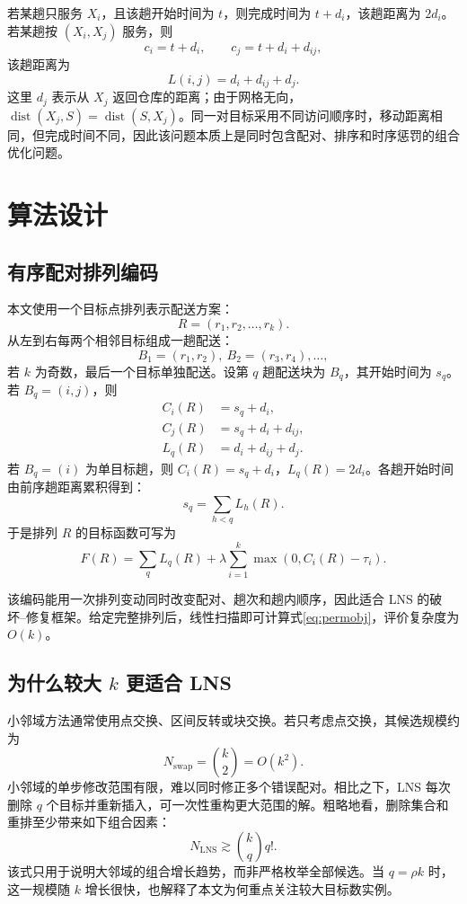 \documentclass[11pt,a4paper]{ctexart}
\begin{document}
\indent 若某趟只服务 $X_i$，且该趟开始时间为 $t$，则完成时间为 $t+d_i$，该趟距离为 $2d_i$。若某趟按 $(X_i,X_j)$ 服务，则
\[
c_i=t+d_i,\qquad c_j=t+d_i+d_{ij},
\]
\indent 该趟距离为
\[
L(i,j)=d_i+d_{ij}+d_j.
\]
\indent 这里 $d_j$ 表示从 $X_j$ 返回仓库的距离；由于网格无向，$\operatorname{dist}(X_j,S)=\operatorname{dist}(S,X_j)$。同一对目标采用不同访问顺序时，移动距离相同，但完成时间不同，因此该问题本质上是同时包含配对、排序和时序惩罚的组合优化问题。

\section{算法设计}

\subsection{有序配对排列编码}

\indent 本文使用一个目标点排列表示配送方案：
\[
R=(r_1,r_2,\ldots,r_k).
\]
\indent 从左到右每两个相邻目标组成一趟配送：
\[
B_1=(r_1,r_2),\ B_2=(r_3,r_4),\ldots,
\]
\indent 若 $k$ 为奇数，最后一个目标单独配送。设第 $q$ 趟配送块为 $B_q$，其开始时间为 $s_q$。若 $B_q=(i,j)$，则
\begin{align}
C_i(R)&=s_q+d_i,\\
C_j(R)&=s_q+d_i+d_{ij},\\
L_q(R)&=d_i+d_{ij}+d_j.
\end{align}
\indent 若 $B_q=(i)$ 为单目标趟，则 $C_i(R)=s_q+d_i$，$L_q(R)=2d_i$。各趟开始时间由前序趟距离累积得到：
\begin{equation}
s_q=\sum_{h<q}L_h(R).
\end{equation}
\indent 于是排列 $R$ 的目标函数可写为
\begin{equation}
F(R)=\sum_q L_q(R)+\lambda\sum_{i=1}^k \max(0,C_i(R)-\tau_i).\label{eq:permobj}
\end{equation}

\indent 该编码能用一次排列变动同时改变配对、趟次和趟内顺序，因此适合 LNS 的破坏--修复框架。给定完整排列后，线性扫描即可计算式\eqref{eq:permobj}，评价复杂度为 $O(k)$。

\subsection{为什么较大 \texorpdfstring{$k$}{k} 更适合 LNS}

\indent 小邻域方法通常使用点交换、区间反转或块交换。若只考虑点交换，其候选规模约为
\[
N_{\mathrm{swap}}=\binom{k}{2}=O(k^2).
\]
\indent 小邻域的单步修改范围有限，难以同时修正多个错误配对。相比之下，LNS 每次删除 $q$ 个目标并重新插入，可一次性重构更大范围的解。粗略地看，删除集合和重排至少带来如下组合因素：
\begin{equation}
N_{\mathrm{LNS}}\gtrsim \binom{k}{q}q!.
\end{equation}
\indent 该式只用于说明大邻域的组合增长趋势，而非严格枚举全部候选。当 $q=\rho k$ 时，这一规模随 $k$ 增长很快，也解释了本文为何重点关注较大目标数实例。
\end{document}
